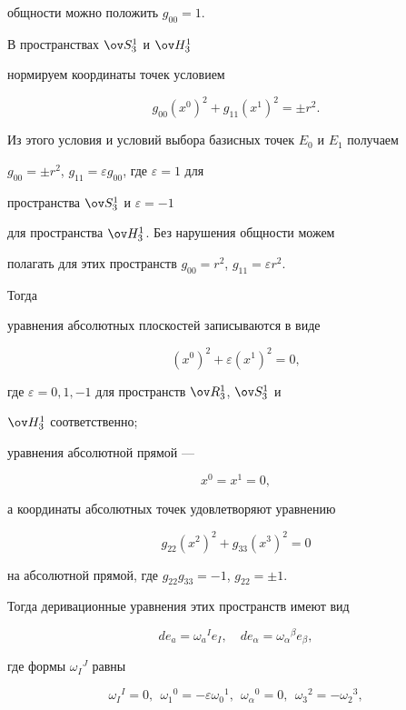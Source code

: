 общности можно положить $g_{00}=1$.





В пространствах $\ov S^1_3$ и $\ov H^1_3$


нормируем координаты точек условием


$$


g_{00}(x^0)^2+g_{11}(x^1)^2=\pm r^2.


$$


Из этого условия и условий выбора базисных точек $E_0$ и $E_1$ получаем


$g_{00}=\pm r^2$, $g_{11}=\varepsilon g_{00}$, где $\varepsilon=1$ для 


пространства $\ov S^1_3$ и $\varepsilon=-1$


для пространства $\ov H^1_3$. Без нарушения общности можем


полагать для этих пространств $g_{00}=r^2$, $g_{11}=\varepsilon r^2$. 


Тогда


уравнения абсолютных плоскостей записываются в виде


$$


(x^0)^2+\varepsilon(x^1)^2=0,


$$


где $\varepsilon=0,1,-1$ для пространств $\ov R^1_3$, $\ov S^1_3$ и 


$\ov H^1_3$ соответственно;


уравнения абсолютной прямой ---


$$


x^0=x^1=0,


$$


а координаты абсолютных точек удовлетворяют уравнению


$$


g_{22}(x^2)^2+g_{33}(x^3)^2=0


$$


на абсолютной прямой, где $g_{22}g_{33}=-1$, $g_{22}=\pm1$.


Тогда деривационные уравнения этих пространств имеют вид


\begin{equation}


de_a=\omega_a{}^I e_I,\quad de_\alpha=\omega_\alpha{}^\beta e_\beta,


\end{equation}


где формы $\omega_I{}^J$ равны


\begin{equation}


\omega_I{}^I=0,\ \ \omega_1{}^0=-\varepsilon\omega_0{}^1,


\ \ \omega_\alpha{}^0=0,\ \ \omega_3{}^2=-\omega_2{}^3,


\end{equation}


